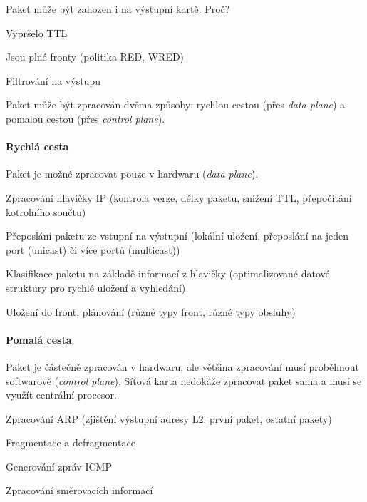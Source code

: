 \noindent Paket může být zahozen i na výstupní kartě. Proč? \begin{compactitem}
    \item Vypršelo TTL
    \item Jsou plné fronty (politika RED, WRED)
    \item Filtrování na výstupu
\end{compactitem}

\noindent Paket může být zpracován dvěma způsoby: rychlou cestou (přes \textit{data plane}) a pomalou cestou (přes \textit{control plane}).

\paragraph*{Rychlá cesta} Paket je možné zpracovat pouze v hardwaru (\textit{data plane}). \begin{compactitem}
    \item Zpracování hlavičky IP (kontrola verze, délky paketu, snížení TTL, přepočítání kotrolního součtu)
    \item Přeposlání paketu ze vstupní na výstupní (lokální uložení, přeposlání na jeden port (unicast) či více portů (multicast))
    \item Klasifikace paketu na základě informací z hlavičky (optimalizované datové struktury pro rychlé uložení a vyhledání)
    \item Uložení do front, plánování (různé typy front, různé typy obsluhy)
\end{compactitem}

\paragraph*{Pomalá cesta} Paket je částečně zpracován v hardwaru, ale většina zpracování musí proběhnout softwarově (\textit{control plane}). Síťová karta nedokáže zpracovat paket sama a musí se využít centrální procesor. \begin{compactitem}
    \item Zpracování ARP (zjištění výstupní adresy L2: první paket, ostatní pakety)
    \item Fragmentace a defragmentace
    \item Generování zpráv ICMP
    \item Zpracování směrovacích informací
\end{compactitem}


